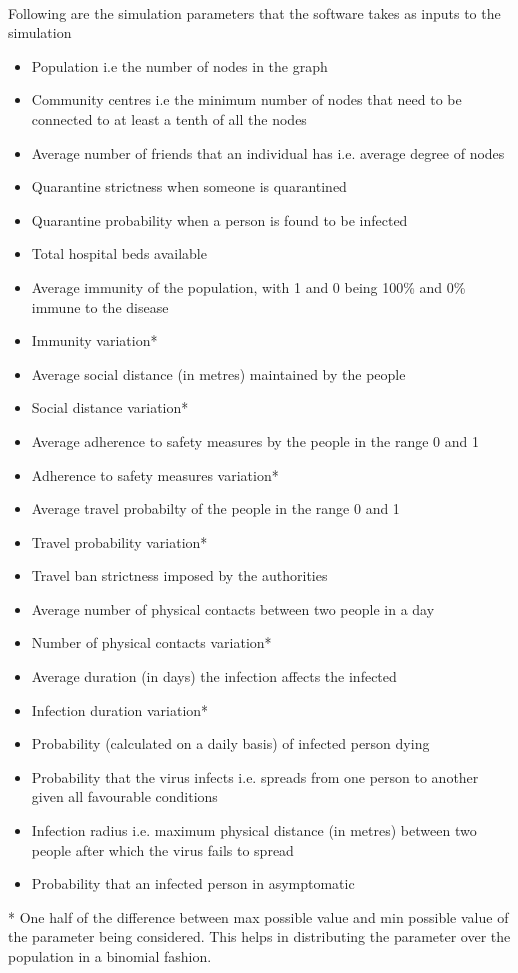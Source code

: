 \documentclass[12pt, a4paper]{extarticle}
\begin{document}
            \paragraph{} Following are the simulation parameters that the software takes as inputs to the simulation
            \begin{itemize}
                \item Population i.e the number of nodes in the graph
				\item Community centres i.e the minimum number of nodes that need to be connected to at least a tenth of all the nodes
				\item Average number of friends that an individual has i.e. average degree of nodes
				\item Quarantine strictness when someone is quarantined
				\item Quarantine probability when a person is found to be infected
				\item Total hospital beds available
				\item Average immunity of the population, with 1 and 0 being 100\% and 0\% immune to the disease
				\item Immunity variation*
				\item Average social distance (in metres) maintained by the people
				\item Social distance variation*
				\item Average adherence to safety measures by the people in the range 0 and 1
				\item Adherence to safety measures variation*
				\item Average travel probabilty of the people in the range 0 and 1
				\item Travel probability variation*
				\item Travel ban strictness imposed by the authorities
				\item Average number of physical contacts between two people in a day
				\item Number of physical contacts variation*
				\item Average duration (in days) the infection affects the infected
				\item Infection duration variation*
				\item Probability (calculated on a daily basis) of infected person dying
				\item Probability that the virus infects i.e. spreads from one person to another given all favourable conditions
				\item Infection radius i.e. maximum physical distance (in metres) between two people after which the virus fails to spread
				\item Probability that an infected person in asymptomatic
            \end{itemize}
        * One half of the difference between max possible value and min possible value of the parameter being considered. This helps in distributing the parameter over the population in a binomial fashion.
\end{document}
